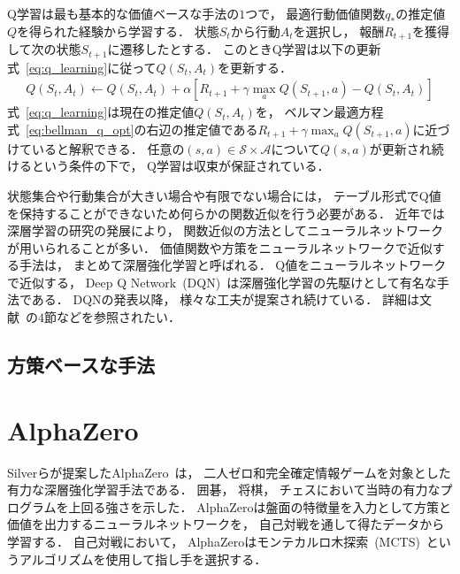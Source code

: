 Q学習は最も基本的な価値ベースな手法の$1$つで， 最適行動価値関数$q_*$の推定値$Q$を得られた経験から学習する．
状態$S_t$から行動$A_t$を選択し， 報酬$R_{t+1}$を獲得して次の状態$S_{t+1}$に遷移したとする．
このときQ学習は以下の更新式~\ref{eq:q_learning}に従って$Q(S_t, A_t)$を更新する．
\begin{align}
  \label{eq:q_learning}
  Q(S_t, A_t) \leftarrow Q(S_t, A_t) + \alpha [R_{t+1} + \gamma \max_a Q(S_{t+1}, a) - Q(S_t, A_t)] 
\end{align}
式~\ref{eq:q_learning}は現在の推定値$Q(S_t, A_t)$を， ベルマン最適方程式~\ref{eq:bellman_q_opt}の右辺の推定値である$R_{t+1} + \gamma \max_a Q(S_{t+1}, a)$に近づけていると解釈できる．
任意の$(s, a) \in \mathcal{S} \times \mathcal{A}$について$Q(s,a)$が更新され続けるという条件の下で， Q学習は収束が保証されている．

状態集合や行動集合が大きい場合や有限でない場合には， テーブル形式でQ値を保持することができないため何らかの関数近似を行う必要がある．
近年では深層学習の研究の発展により， 関数近似の方法としてニューラルネットワークが用いられることが多い．
価値関数や方策をニューラルネットワークで近似する手法は， まとめて深層強化学習と呼ばれる．
Q値をニューラルネットワークで近似する， Deep Q Network~(DQN)~\cite{DQN}は深層強化学習の先駆けとして有名な手法である． 
DQNの発表以降， 様々な工夫が提案され続けている．
詳細は文献~\cite{deepRL}の$4$節などを参照されたい．

\subsection{方策ベースな手法}

\section{AlphaZero}
Silverらが提案したAlphaZero~\cite{AlphaZero}は， 二人ゼロ和完全確定情報ゲームを対象とした有力な深層強化学習手法である．
囲碁， 将棋， チェスにおいて当時の有力なプログラムを上回る強さを示した．
AlphaZeroは盤面の特徴量を入力として方策と価値を出力するニューラルネットワークを， 自己対戦を通して得たデータから学習する．
自己対戦において， AlphaZeroはモンテカルロ木探索~(MCTS)~というアルゴリズムを使用して指し手を選択する．

